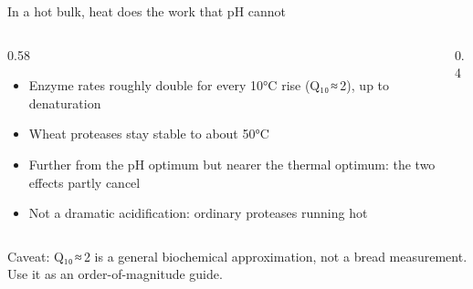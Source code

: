 \documentclass[aspectratio=169,11pt]{beamer}
\newcommand{\muted}[1]{{\color{muted}#1}}
\begin{document}
\begin{frame}{In a hot bulk, heat does the work that pH cannot}
  \begin{columns}[T,onlytextwidth]
    \begin{column}{0.58\textwidth}
      \small
      \begin{itemize}\setlength{\itemsep}{0.3em}
        \item Enzyme rates roughly double for every 10°C rise
          (Q₁₀\,≈\,2), up to denaturation
        \item Wheat proteases stay stable to about 50°C
        \item Further from the pH optimum but nearer the thermal optimum:
          the two effects partly cancel
        \item Not a dramatic acidification: ordinary proteases running hot
      \end{itemize}
    \end{column}
    \begin{column}{0.4\textwidth}
      \centering
    \end{column}
  \end{columns}
  \bigskip
  {\footnotesize\muted{Caveat: Q₁₀\,≈\,2 is a general biochemical
    approximation, not a bread measurement. Use it as an order-of-magnitude
    guide.}}
\end{frame}
\end{document}
